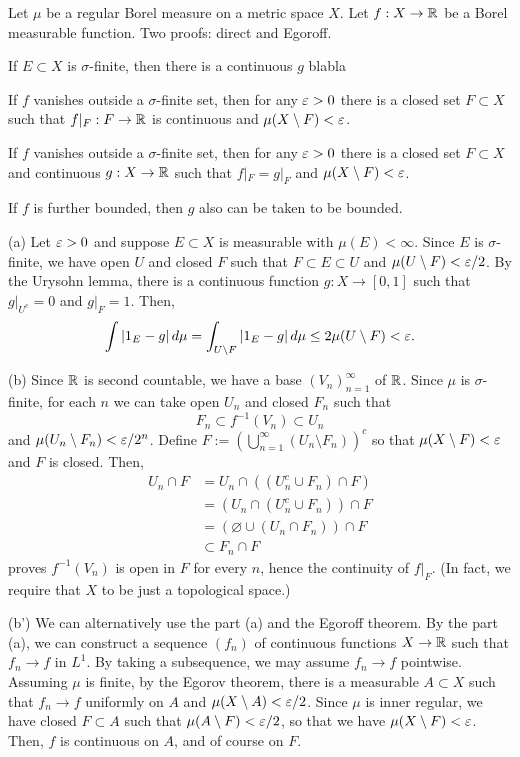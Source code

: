 \documentclass{../../large}
\begin{document}
\begin{prb}
Let $\mu$ be a regular Borel measure on a metric space $X$.
Let $f:X\to\mathbb{R}$ be a Borel measurable function.
Two proofs: direct and Egoroff.
\begin{parts}
\item If $E\subset X$ is $\sigma$-finite, then there is a continuous $g$ blabla
\item If $f$ vanishes outside a $\sigma$-finite set, then for any $\varepsilon>0$ there is a closed set $F\subset X$ such that $f|_F:F\to\mathbb{R}$ is continuous and $\mu(X\setminus F)<\varepsilon$.
\item If $f$ vanishes outside a $\sigma$-finite set, then for any $\varepsilon>0$ there is a closed set $F\subset X$ and continuous $g:X\to\mathbb{R}$ such that $f|_F=g|_F$ and $\mu(X\setminus F)<\varepsilon$.
\item If $f$ is further bounded, then $g$ also can be taken to be bounded.
\end{parts}
\end{prb}
\begin{pf}
(a)
Let $\varepsilon>0$ and suppose $E\subset X$ is measurable with $\mu(E)<\infty$.
Since $E$ is $\sigma$-finite, we have open $U$ and closed $F$ such that $F\subset E\subset U$ and $\mu(U\setminus F)<\varepsilon/2$.
By the Urysohn lemma, there is a continuous function $g:X\to[0,1]$ such that $g|_{U^c}=0$ and $g|_F=1$.
Then,
\[\int|1_E-g|\,d\mu=\int_{U\setminus F}|1_E-g|\,d\mu\le2\mu(U\setminus F)<\varepsilon.\]

(b)
Since $\mathbb{R}$ is second countable, we have a base $(V_n)_{n=1}^\infty$ of $\mathbb{R}$.
Since $\mu$ is $\sigma$-finite, for each $n$ we can take open $U_n$ and closed $F_n$ such that
\[F_n\subset f^{-1}(V_n)\subset U_n\]
and $\mu(U_n\setminus F_n)<\varepsilon/2^n$.
Define $F:=\left(\bigcup_{n=1}^\infty(U_n\setminus F_n)\right)^c$ so that $\mu(X\setminus F)<\varepsilon$ and $F$ is closed.
Then,
\begin{align*}
U_n\cap F
&=U_n\cap((U_n^c\cup F_n)\cap F)\\
&=(U_n\cap(U_n^c\cup F_n))\cap F\\
&=(\varnothing\cup(U_n\cap F_n))\cap F\\
&\subset F_n\cap F
\end{align*}
proves $f^{-1}(V_n)$ is open in $F$ for every $n$, hence the continuity of $f|_F$.
(In fact, we require that $X$ to be just a topological space.)

(b')
We can alternatively use the part (a) and the Egoroff theorem.
By the part (a), we can construct a sequence $(f_n)$ of continuous functions $X\to\mathbb{R}$ such that $f_n\to f$ in $L^1$.
By taking a subsequence, we may assume $f_n\to f$ pointwise.
Assuming $\mu$ is finite, by the Egorov theorem, there is a measurable $A\subset X$ such that $f_n\to f$ uniformly on $A$ and $\mu(X\setminus A)<\varepsilon/2$.
Since $\mu$ is inner regular, we have closed $F\subset A$ such that $\mu(A\setminus F)<\varepsilon/2$, so that we have $\mu(X\setminus F)<\varepsilon$.
Then, $f$ is continuous on $A$, and of course on $F$.

\end{pf}
\end{document}
